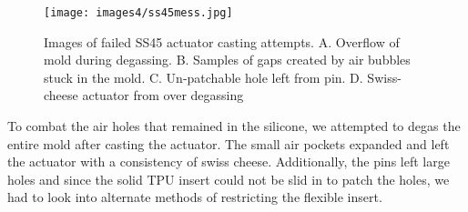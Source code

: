 \begin{figure}[h]
    \centering
    \texttt{[image: images4/ss45mess.jpg]}
    \caption{Images of failed SS45 actuator casting attempts. A. Overflow of mold during degassing. B. Samples of gaps created by air bubbles stuck in the mold. C. Un-patchable hole left from pin. D. Swiss-cheese actuator from over degassing}
    \label{fig:ss45mess}
\end{figure}

To combat the air holes that remained in the silicone, we attempted to degas the entire mold after casting the actuator. The small air pockets expanded and left the actuator with a consistency of swiss cheese. Additionally, the pins left large holes and since the solid TPU insert could not be slid in to patch the holes, we had to look into alternate methods of restricting the flexible insert. 


